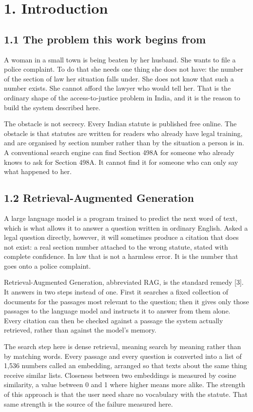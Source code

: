\documentclass[12pt,a4paper]{article}
\begin{document}
\section*{1. Introduction}
\subsection*{1.1 The problem this work begins from}
A woman in a small town is being beaten by her husband. She wants to file a police complaint. To do that she needs one thing she does not have: the number of the section of law her situation falls under. She does not know that such a number exists. She cannot afford the lawyer who would tell her. That is the ordinary shape of the access-to-justice problem in India, and it is the reason to build the system described here.

The obstacle is not secrecy. Every Indian statute is published free online. The obstacle is that statutes are written for readers who already have legal training, and are organised by section number rather than by the situation a person is in. A conventional search engine can find Section 498A for someone who already knows to ask for Section 498A. It cannot find it for someone who can only say what happened to her.

\subsection*{1.2 Retrieval-Augmented Generation}
A large language model is a program trained to predict the next word of text, which is what allows it to answer a question written in ordinary English. Asked a legal question directly, however, it will sometimes produce a citation that does not exist: a real section number attached to the wrong statute, stated with complete confidence. In law that is not a harmless error. It is the number that goes onto a police complaint.

Retrieval-Augmented Generation, abbreviated RAG, is the standard remedy [3]. It answers in two steps instead of one. First it searches a fixed collection of documents for the passages most relevant to the question; then it gives only those passages to the language model and instructs it to answer from them alone. Every citation can then be checked against a passage the system actually retrieved, rather than against the model's memory.

The search step here is dense retrieval, meaning search by meaning rather than by matching words. Every passage and every question is converted into a list of 1,536 numbers called an embedding, arranged so that texts about the same thing receive similar lists. Closeness between two embeddings is measured by cosine similarity, a value between 0 and 1 where higher means more alike. The strength of this approach is that the user need share no vocabulary with the statute. That same strength is the source of the failure measured here.
\end{document}
